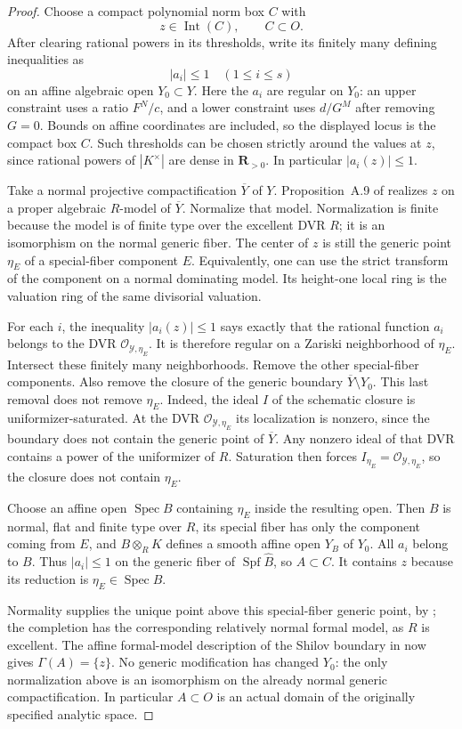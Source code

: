 \documentclass[11pt,a4paper]{article}
\numberwithin{equation}{section}
\theoremstyle{definition}
\theoremstyle{remark}
\begin{document}
\begin{proof}
Choose a compact polynomial norm box $C$ with
\[
 z\in\operatorname{Int}(C),\qquad C\subset O.
\]
After clearing rational powers in its thresholds, write its finitely
many defining inequalities as
\[
 |a_i|\leq1\quad(1\leq i\leq s)
\]
on an affine algebraic open $Y_0\subset Y$. Here the $a_i$ are
regular on $Y_0$: an upper constraint uses a ratio $F^N/c$, and a
lower constraint uses $d/G^M$ after removing $G=0$. Bounds on affine
coordinates are included, so the displayed locus is the compact
box $C$. Such thresholds can be chosen strictly around the values
at $z$, since rational powers of $|K^\times|$ are dense in
$\mathbf R_{>0}$. In particular $|a_i(z)|\leq1$.

Take a normal projective compactification $\overline Y$ of $Y$.
Proposition~A.9 of \cite{GM19} realizes $z$ on a proper algebraic
$R$-model of $\overline Y$. Normalize that model. Normalization is
finite because the model is of finite type over the excellent DVR
$R$; it is an isomorphism on the normal generic fiber. The center
of $z$ is still the generic point $\eta_E$ of a special-fiber
component $E$. Equivalently, one can use the strict transform of
the component on a normal dominating model. Its height-one local
ring is the valuation ring of the same divisorial valuation.

For each $i$, the inequality $|a_i(z)|\leq1$ says exactly that
the rational function $a_i$ belongs to the DVR
$\mathcal O_{\mathscr Y,\eta_E}$. It is therefore regular on a
Zariski neighborhood of $\eta_E$. Intersect these finitely many
neighborhoods. Remove the other special-fiber components. Also
remove the closure of the generic boundary
$\overline Y\setminus Y_0$. This last removal does not remove
$\eta_E$. Indeed, the ideal $I$ of the schematic closure is
uniformizer-saturated. At the DVR
$\mathcal O_{\mathscr Y,\eta_E}$ its localization is nonzero,
since the boundary does not contain the generic point of
$\overline Y$. Any nonzero ideal of that DVR contains a power
of the uniformizer of $R$. Saturation then forces
$I_{\eta_E}=\mathcal O_{\mathscr Y,\eta_E}$, so the closure
does not contain $\eta_E$.

Choose an affine open $\operatorname{Spec}B$ containing $\eta_E$
inside the resulting open. Then $B$ is normal, flat and finite type
over $R$, its special fiber has only the component coming from
$E$, and $B\otimes_RK$ defines a smooth affine open $Y_B$ of
$Y_0$. All $a_i$ belong to $B$. Thus $|a_i|\leq1$ on the
generic fiber of $\operatorname{Spf}\widehat B$, so $A\subset C$.
It contains $z$ because its reduction is $\eta_E\in\operatorname{Spec}B$.

Normality supplies the unique point above this special-fiber
generic point, by \cite[Proposition~6.9.7]{CLD12}; the completion
has the corresponding relatively normal formal model, as $R$ is
excellent. The affine formal-model description of the Shilov
boundary in \cite[Proposition~A.3]{GM19} now gives
$\Gamma(A)=\{z\}$. No generic modification has changed $Y_0$:
the only normalization above is an isomorphism on the already
normal generic compactification. In particular $A\subset O$ is
an actual domain of the originally specified analytic space.
\end{proof}
\end{document}
